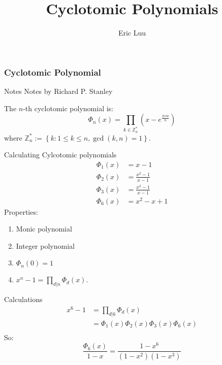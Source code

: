 \documentclass[]{beamer}
\title{Cyclotomic Polynomials}
\author{Eric Luu}
\begin{document}
\begin{frame}
\frametitle{Cyclotomic Polynomial}
\begin{block}{Notes}
	Notes by Richard P. Stanley
\end{block}
The $n$-th cyclotomic polynomial is:
	\begin{equation}
		\Phi_n(x) = \prod_{k \in \mathbb{Z}_n^*}\left(x - e^{\frac{2 i \pi k}{n}}\right)
	\end{equation}
	where $\mathbb{Z}_n^* := \left\lbrace k : 1 \leq k \leq n, \gcd(k, n) = 1 \right\rbrace$. 
\note{
}
\end{frame}

\begin{frame}{Calculating Cylcotomic polynomials}
	\begin{align*}
		\Phi_1(x) &= x - 1\\
		\Phi_2(x) &= \frac{x^2 - 1}{x - 1}\\
		\Phi_3(x) &= \frac{x^3 - 1}{x-1}\\
		\Phi_6(x) &= x^2 - x + 1
	\end{align*}
	Properties:
	\begin{enumerate}
		\item Monic polynomial
		\item Integer polynomial
		\item $\Phi_n(0) = 1$
		\item $x^n - 1 = \prod_{d|n} \Phi_d(x)$.
	\end{enumerate}
\end{frame}
\begin{frame}{Calculations}
	\begin{align*}
		x^6 - 1 &= \prod_{d | 6} \Phi_d(x)\\
		&= \Phi_1(x) \Phi_2(x) \Phi_3(x) \Phi_6(x)\\
	\end{align*}
	So:
	\begin{equation}
		\frac{\Phi_6(x)}{1-x} = \frac{1 - x^6}{(1 - x^2)(1 - x^3)}
	\end{equation}
\end{frame}
\end{document}
